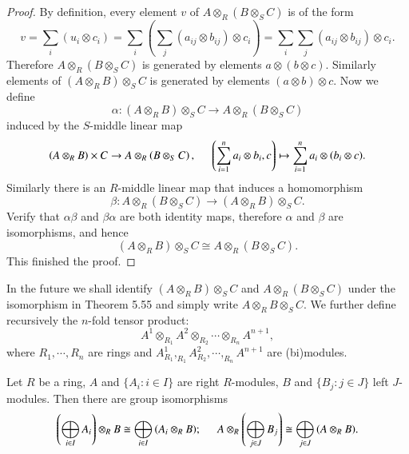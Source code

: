\begin{proof}
By definition, every element $v$ of $A\otimes_R(B\otimes_SC)$ is of the form 
$$
v=\sum_i{\left( u_i\otimes c_i \right)}=\sum_i{\left( \sum_j{\left( a_{ij}\otimes b_{ij} \right)}\otimes c_i \right)}=\sum_i{\sum_j{\left( a_{ij}\otimes b_{ij} \right) \otimes c_i}}.
$$
Therefore $A\otimes_R(B\otimes_SC)$ is generated by elements $a\otimes(b\otimes c)$. Similarly elements of $(A\otimes_RB)\otimes_SC$ is generated by elements $(a\otimes b)\otimes c$. Now we define 
$$
\alpha :\left( A\otimes _RB \right) \otimes _SC\rightarrow A\otimes _R\left( B\otimes _SC \right) 
$$
induced by the $S$-middle linear map 
$$
\left( A\otimes _RB \right) \times C\rightarrow A\otimes _R\left( B\otimes _SC \right) ,\hspace{0.5cm}\left( \sum_{i=1}^n{a_i\otimes b_i},c \right) \mapsto \sum_{i=1}^n{a_i\otimes \left( b_i\otimes c \right)}.
$$
Similarly there is an $R$-middle linear map that induces a homomorphism 
$$
\beta :A\otimes _R\left( B\otimes _SC \right) \rightarrow \left( A\otimes _RB \right) \otimes _SC.
$$
Verify that $\alpha\beta$ and $\beta\alpha$ are both identity maps, therefore $\alpha$ and $\beta$ are isomorphisms, and hence 
$$
\left( A\otimes _RB \right) \otimes _SC\cong A\otimes _R\left( B\otimes _SC \right) .
$$
This finished the proof.
\end{proof}
In the future we shall identify $\left( A\otimes _RB \right) \otimes _SC$ and $A\otimes _R\left( B\otimes _SC \right) $ under the isomorphism in Theorem 5.55 and simply write $A\otimes_RB\otimes_SC$. We further define recursively the $n$-fold tensor product: 
$$
A^1\otimes _{R_1}A^2\otimes _{R_2}\cdots \otimes _{R_n}A^{n+1},
$$
where $R_1,\cdots,R_n$ are rings and $A_{R_1}^1,_{R_1}A_{R_2}^2,\cdots,_{R_n}A^{n+1}$ are (bi)modules.
\begin{theorem}
Let $R$ be a ring, $A$ and $\{A_i:i\in I\}$ are right $R$-modules, $B$ and $\{B_j:j\in J\}$ left $J$-modules. Then there are group isomorphisms 
$$
\left( \bigoplus_{i\in I}{A_i} \right) \otimes _RB\cong \bigoplus_{i\in I}{\left( A_i\otimes _RB \right)};\hspace{0.5cm}A\otimes _R\left( \bigoplus_{j\in J}{B_j} \right) \cong \bigoplus_{j\in J}{\left( A\otimes _RB \right)}.
$$
\end{theorem}
